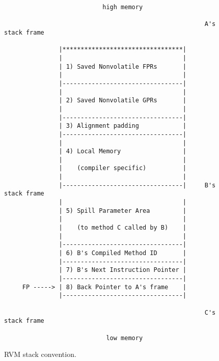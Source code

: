 
\begin{figure}
\begin{verbatim}
                           high memory

                                                       A's stack frame

               |*********************************|
               |                                 |
               | 1) Saved Nonvolatile FPRs       |
               |                                 |
               |---------------------------------|
               |                                 |
               | 2) Saved Nonvolatile GPRs       |
               |                                 |
               |---------------------------------|
               | 3) Alignment padding            |
               |---------------------------------|
               |                                 |
               | 4) Local Memory                 |
               |                                 |
               |    (compiler specific)          |
               |                                 |
               |---------------------------------|     B's stack frame
               |                                 |
               | 5) Spill Parameter Area         |
               |                                 |
               |    (to method C called by B)    |
               |                                 |
               |---------------------------------|
               | 6) B's Compiled Method ID       |
               |---------------------------------|
               | 7) B's Next Instruction Pointer |
               |---------------------------------|
     FP -----> | 8) Back Pointer to A's frame    |
               |---------------------------------|

                                                       C's stack frame

                            low memory

\end{verbatim}
\label{fig:stackframe}
\caption{RVM stack convention.}
\end{figure}

